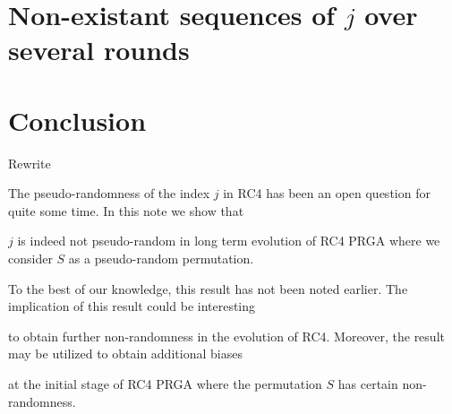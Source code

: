 \documentclass{llncs}
\begin{document}
\section{Non-existant sequences of $j$ over several rounds}



\section{Conclusion}

Rewrite



The pseudo-randomness of the index $j$ in RC4 has been an open question for quite some time. In this note we show that

$j$ is indeed not pseudo-random in long term evolution of RC4 PRGA where we consider $S$ as a pseudo-random permutation. 

To the best of our knowledge, this result has not been noted earlier. The implication of this result could be interesting 

to obtain further non-randomness in the evolution of RC4. Moreover, the result may be utilized to obtain additional biases 

at the initial stage of RC4 PRGA where the permutation $S$ has certain non-randomness.  
\end{document}
